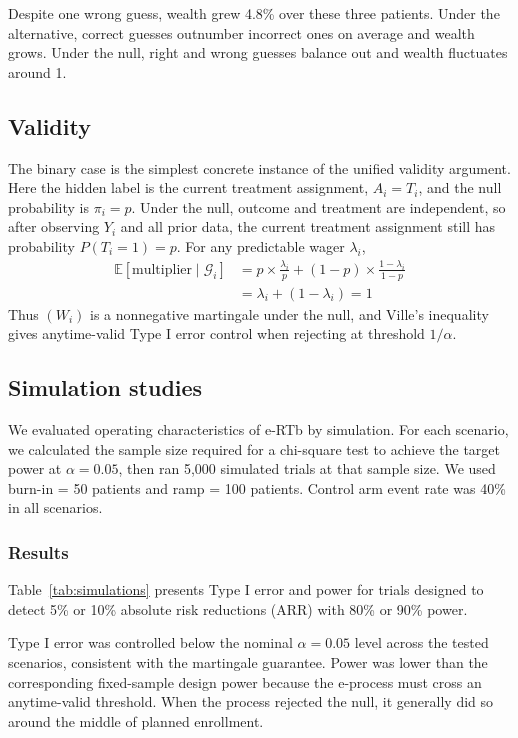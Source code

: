 \documentclass[10pt]{article}
\begin{document}
Despite one wrong guess, wealth grew 4.8\% over these three patients. Under the alternative, correct guesses outnumber incorrect ones on average and wealth grows. Under the null, right and wrong guesses balance out and wealth fluctuates around 1.

\subsection{Validity}

The binary case is the simplest concrete instance of the unified validity argument. Here the hidden label is the current treatment assignment, $A_i=T_i$, and the null probability is $\pi_i=p$. Under the null, outcome and treatment are independent, so after observing $Y_i$ and all prior data, the current treatment assignment still has probability $P(T_i=1)=p$. For any predictable wager $\lambda_i$,
\begin{align}
\mathbb{E}[\text{multiplier} \mid \mathcal{G}_i] &= p \times \frac{\lambda_i}{p} + (1-p) \times \frac{1 - \lambda_i}{1-p} \\
&= \lambda_i + (1 - \lambda_i) = 1
\end{align}
Thus $(W_i)$ is a nonnegative martingale under the null, and Ville's inequality gives anytime-valid Type I error control when rejecting at threshold $1/\alpha$.

\subsection{Simulation studies}

We evaluated operating characteristics of e-RTb by simulation. For each scenario, we calculated the sample size required for a chi-square test to achieve the target power at $\alpha = 0.05$, then ran 5{,}000 simulated trials at that sample size. We used burn-in = 50 patients and ramp = 100 patients. Control arm event rate was 40\% in all scenarios.

\subsubsection{Results}

Table~\ref{tab:simulations} presents Type I error and power for trials designed to detect 5\% or 10\% absolute risk reductions (ARR) with 80\% or 90\% power.



Type I error was controlled below the nominal $\alpha = 0.05$ level across the tested scenarios, consistent with the martingale guarantee. Power was lower than the corresponding fixed-sample design power because the e-process must cross an anytime-valid threshold. When the process rejected the null, it generally did so around the middle of planned enrollment.
\end{document}
